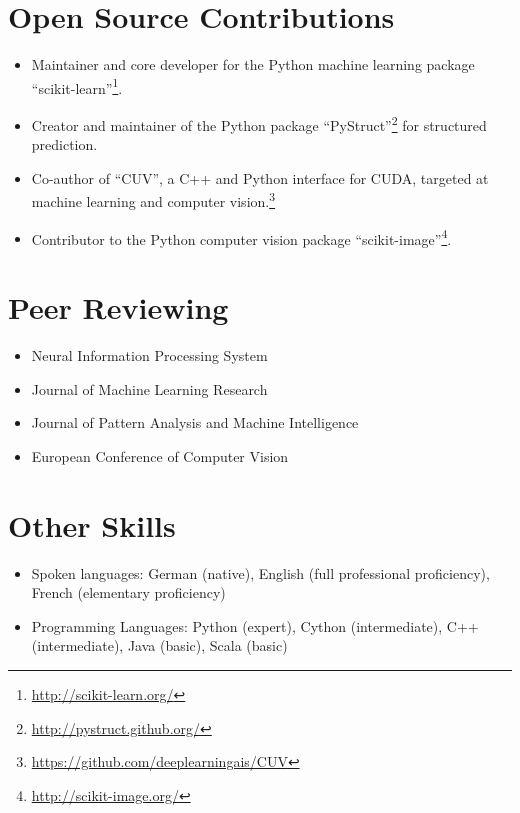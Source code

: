 \documentclass[a4paper,11pt]{article}
\begin{document}
\section{Open Source Contributions}
\begin{itemize}
    \item Maintainer and core developer for the Python machine learning package ``scikit-learn''\footnote{\url{http://scikit-learn.org/}}.
    \item Creator and maintainer of the Python package ``PyStruct''\footnote{\url{http://pystruct.github.org/}} for structured prediction.
    \item Co-author of ``CUV'', a C++ and Python interface for CUDA,
        targeted at machine learning and computer vision.\footnote{\url{https://github.com/deeplearningais/CUV}}
    \item Contributor to the Python computer vision package ``scikit-image''\footnote{\url{http://scikit-image.org/}}.
\end{itemize}
\pagebreak

\section{Peer Reviewing}
\begin{itemize}
    \item Neural Information Processing System
    \item Journal of Machine Learning Research
    \item Journal of Pattern Analysis and Machine Intelligence
    \item European Conference of Computer Vision
\end{itemize}

\section{Other Skills}
\begin{itemize}
    \item Spoken languages: German (native), English (full professional proficiency), French (elementary proficiency)
    \item Programming Languages: Python (expert), Cython (intermediate), C++ (intermediate), Java (basic), Scala (basic)
\end{itemize}

\begin{publications}
\end{publications}
\end{document}
